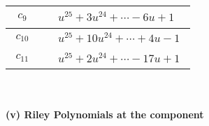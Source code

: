 \documentclass[1p]{elsarticle_modified}
\theoremstyle{definition}
\begin{document}
\begin{tabular}{m{50pt}|m{274pt}}
\hline $$\begin{aligned}c_{9}\end{aligned}$$&$\begin{aligned}
&u^{25}+3 u^{24}+\cdots-6 u+1
\end{aligned}$\\
\hline $$\begin{aligned}c_{10}\end{aligned}$$&$\begin{aligned}
&u^{25}+10 u^{24}+\cdots+4 u-1
\end{aligned}$\\
\hline $$\begin{aligned}c_{11}\end{aligned}$$&$\begin{aligned}
&u^{25}+2 u^{24}+\cdots-17 u+1
\end{aligned}$\\
\hline
\end{tabular}\\~\\
\newpage\renewcommand{\arraystretch}{1}
\flushleft \textbf{(v) Riley Polynomials at the component}\newline \\
\end{document}
